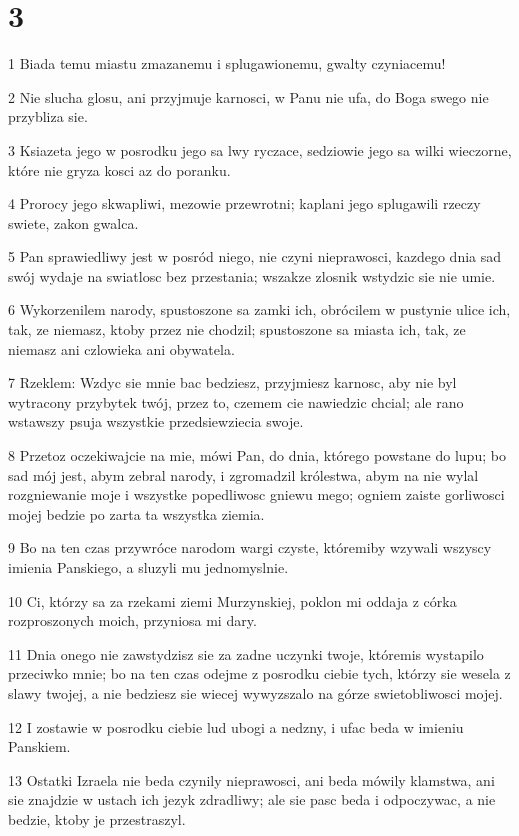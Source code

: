 \chapter{3}

\par 1 Biada temu miastu zmazanemu i splugawionemu, gwalty czyniacemu!
\par 2 Nie slucha glosu, ani przyjmuje karnosci, w Panu nie ufa, do Boga swego nie przybliza sie.
\par 3 Ksiazeta jego w posrodku jego sa lwy ryczace, sedziowie jego sa wilki wieczorne, które nie gryza kosci az do poranku.
\par 4 Prorocy jego skwapliwi, mezowie przewrotni; kaplani jego splugawili rzeczy swiete, zakon gwalca.
\par 5 Pan sprawiedliwy jest w posród niego, nie czyni nieprawosci, kazdego dnia sad swój wydaje na swiatlosc bez przestania; wszakze zlosnik wstydzic sie nie umie.
\par 6 Wykorzenilem narody, spustoszone sa zamki ich, obrócilem w pustynie ulice ich, tak, ze niemasz, ktoby przez nie chodzil; spustoszone sa miasta ich, tak, ze niemasz ani czlowieka ani obywatela.
\par 7 Rzeklem: Wzdyc sie mnie bac bedziesz, przyjmiesz karnosc, aby nie byl wytracony przybytek twój, przez to, czemem cie nawiedzic chcial; ale rano wstawszy psuja wszystkie przedsiewziecia swoje.
\par 8 Przetoz oczekiwajcie na mie, mówi Pan, do dnia, którego powstane do lupu; bo sad mój jest, abym zebral narody, i zgromadzil królestwa, abym na nie wylal rozgniewanie moje i wszystke popedliwosc gniewu mego; ogniem zaiste gorliwosci mojej bedzie po zarta ta wszystka ziemia.
\par 9 Bo na ten czas przywróce narodom wargi czyste, któremiby wzywali wszyscy imienia Panskiego, a sluzyli mu jednomyslnie.
\par 10 Ci, którzy sa za rzekami ziemi Murzynskiej, poklon mi oddaja z córka rozproszonych moich, przyniosa mi dary.
\par 11 Dnia onego nie zawstydzisz sie za zadne uczynki twoje, któremis wystapilo przeciwko mnie; bo na ten czas odejme z posrodku ciebie tych, którzy sie wesela z slawy twojej, a nie bedziesz sie wiecej wywyzszalo na górze swietobliwosci mojej.
\par 12 I zostawie w posrodku ciebie lud ubogi a nedzny, i ufac beda w imieniu Panskiem.
\par 13 Ostatki Izraela nie beda czynily nieprawosci, ani beda mówily klamstwa, ani sie znajdzie w ustach ich jezyk zdradliwy; ale sie pasc beda i odpoczywac, a nie bedzie, ktoby je przestraszyl.
